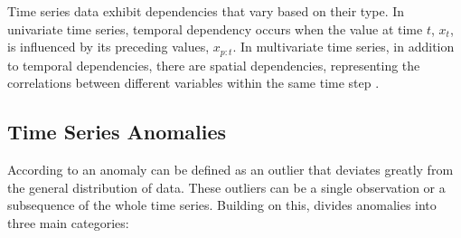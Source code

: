 Time series data exhibit dependencies that vary based on their type. In univariate time series, temporal dependency occurs when the value at time $t$, $x_t$, is influenced by its preceding values, $x_{p:t}$. In multivariate time series, in addition to temporal dependencies, there are spatial dependencies, representing the correlations between different variables within the same time step \cite{Zamanzadeh_Darban_Webb_Pan_Aggarwal_Salehi_2024}.

\subsection{Time Series Anomalies}

According to \cite{Grubbs_1969} an anomaly can be defined as an outlier that deviates greatly from the general distribution of data. These outliers can be a single observation or a subsequence of the whole time series. Building on this, \cite{Blazquez-Garcia_Conde_Mori_Lozano_2021} divides anomalies into three main categories:


